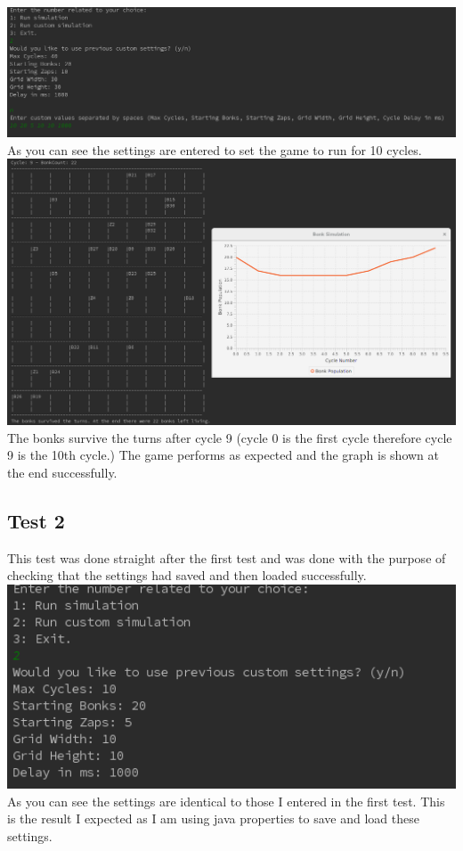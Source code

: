 \documentclass[12pt]{article}
\begin{document}
\includegraphics[width=15cm]{test1a}
As you can see the settings are entered to set the game to run for 10 cycles.\\
\includegraphics[width=15cm]{test1b}
The bonks survive the turns after cycle 9 (cycle 0 is the first cycle therefore cycle 9 is the 10th cycle.) The game performs as expected and the graph is shown at the end successfully.

\subsection{Test 2}
This test was done straight after the first test and was done with the purpose of checking that the settings had saved and then loaded successfully.
\includegraphics[width=15cm]{test2}
As you can see the settings are identical to those I entered in the first test. This is the result I expected as I am using java properties to save and load these settings.
\end{document}
